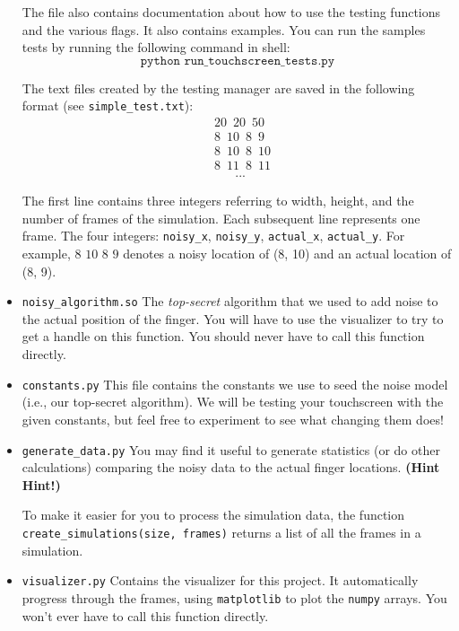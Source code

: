 \documentclass{article}
\begin{document}
\begin{itemize}
  The file also contains documentation about how to use the testing functions and the various flags.
  It also contains examples.
  You can run the samples tests by running the following command in shell:
  $$\texttt{python run\_touchscreen\_tests.py}$$

  The text files created by the testing manager are saved in the following format (see \texttt{simple\_test.txt}):
\begin{align*}
  &20\,\,\,20\,\,\,50 \\
  &8\,\,\,10\,\,\,8\,\,\,9\\
  &8\,\,\,10\,\,\,8\,\,\,10\\
  &8\,\,\,11\,\,\,8\,\,\,11\\
  &\,\,\,\,\,\,\,\,\,\,...
\end{align*}
        
The first line contains three integers referring to width, height, and the number of frames of the simulation.
Each subsequent line represents one frame.
The four integers: \verb|noisy_x|, \verb|noisy_y|, \verb|actual_x|, \verb|actual_y|.
For example, $8\,\,10\,\,8\,\,9$ denotes a noisy location of (8, 10) and an actual location of (8, 9).

\item \texttt{noisy\_algorithm.so}
  The \textit{top-secret\/} algorithm that we used to add noise to the actual position of the finger.
  You will have to use the visualizer to try to get a handle on this function.
  You should never have to call this function directly.

\item \texttt{constants.py}
  This file contains the constants we use to seed the noise model (i.e., our top-secret algorithm).
  We will be testing your touchscreen with the given constants,
  but feel free to experiment to see what changing them does!

\item \texttt{generate\_data.py}
  You may find it useful to generate statistics (or do other calculations)
  comparing the noisy data to the actual finger locations. \textbf{(Hint Hint!)}

  To make it easier for you to process the simulation data,
  the function \texttt{create\_simulations(size, frames)}
  returns a list of all the frames in a simulation.

\item \texttt{visualizer.py}
  Contains the visualizer for this project.
  It automatically progress through the frames, using \texttt{matplotlib} to plot the \texttt{numpy} arrays.
  You won't ever have to call this function directly.
\end{itemize}
    
\end{document}

